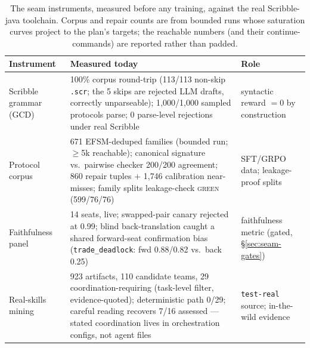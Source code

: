 \documentclass{article}
\begin{document}
\begin{table}[t]
\centering\small
\caption{The seam instruments, measured before any training, against the real Scribble-java toolchain. Corpus and repair counts are from bounded runs whose saturation curves project to the plan's targets; the reachable numbers (and their continue-commands) are reported rather than padded.}
\label{tab:seam-instruments}
\begin{tabular}{@{}p{2.7cm}p{9.1cm}p{1.9cm}@{}}
\toprule
\textbf{Instrument} & \textbf{Measured today} & \textbf{Role} \\
\midrule
Scribble grammar (GCD) & 100\% corpus round-trip (113/113 non-skip \texttt{.scr}; the 5 skips are rejected LLM drafts, correctly unparseable); 1{,}000/1{,}000 sampled protocols parse; 0 parse-level rejections under real Scribble & syntactic reward $=0$ by construction \\
Protocol corpus & 671 EFSM-deduped families (bounded run; $\geq$5k reachable); canonical signature vs.\ pairwise checker 200/200 agreement; 860 repair tuples $+$ 1{,}746 calibration near-misses; family splits leakage-check \textsc{green} (599/76/76) & SFT/GRPO data; leakage-proof splits \\
Faithfulness panel & 14 seats, live; swapped-pair canary rejected at 0.99; blind back-translation caught a shared forward-seat confirmation bias (\texttt{trade\_deadlock}: fwd 0.88/0.82 vs.\ back 0.25) & faithfulness metric (gated, \S\ref{sec:seam-gates}) \\
Real-skills mining & 923 artifacts, 110 candidate teams, 29 coordination-requiring (task-level filter, evidence-quoted); deterministic path 0/29; careful reading recovers 7/16 assessed --- stated coordination lives in orchestration configs, not agent files & \texttt{test-real} source; in-the-wild evidence \\
\bottomrule
\end{tabular}
\end{table}
\end{document}

